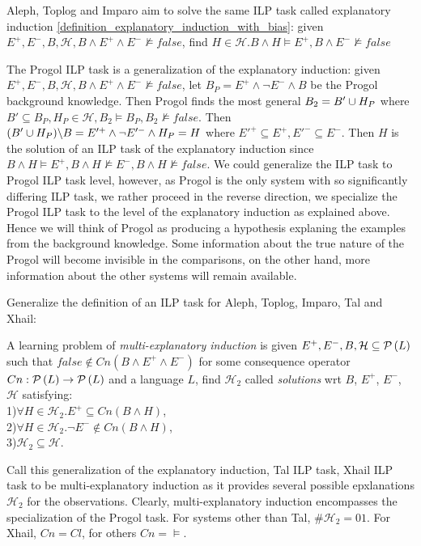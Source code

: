 Aleph, Toplog and Imparo aim to solve the same ILP task called explanatory induction \ref{definition_explanatory_induction_with_bias}:
given $E^{+}, E^{-}, B, \mathcal{H}, B \land E^{+} \land E^{-} \not\models false$, find $H \in \mathcal{H}. B \land H \models E^{+}, B \land E^{-} \not\models false$

The Progol ILP task is a generalization of the explanatory induction: given $E^{+}, E^{-}, B, \mathcal{H}, B \land E^{+} \land E^{-} \not\models false$,
let $B_P=E^{+} \land \neg E^{-} \land B$ be the Progol background knowledge. Then Progol finds the most general $B_2 = B' \cup H_P$ where $B' \subseteq B_P, H_P \in \mathcal{H}, B_2 \models B_P, B_2 \not\models false$.
Then $(B' \cup H_P) \backslash B=E'^{+} \land \neg E'^- \land H_P = H$ where $E'^+ \subseteq E^+, E'^- \subseteq E^-$. Then $H$ is the solution of an ILP task of the explanatory induction since $B \land H \models E^{+}, B \land H \not\models E^{-}, B \land H \not\models false$. We could generalize the ILP task to Progol ILP task level, however, as Progol is the only system with so significantly differing ILP task, we rather proceed in the reverse direction, we specialize the Progol ILP task to the level of the explanatory induction as explained above. Hence we will think of Progol as producing a hypothesis explaning the examples from the background knowledge. Some information about the true nature of the Progol will become invisible in the comparisons, on the other hand, more information about the other systems will remain available.

Generalize the definition of an ILP task for Aleph, Toplog, Imparo, Tal and Xhail:

\begin{defn}A learning problem of \emph{multi-explanatory induction} is
given $E^{+}, E^{-}, B, \mathcal{H} \subseteq \mathcal{P} \left({ L }\right)$ such that $false \not\in Cn(B \land E^{+} \land E^{-})$ for some consequence operator $Cn:\mathcal{P} \left({ L }\right) \to \mathcal{P} \left({ L }\right)$ and a language $L$,
find $\mathcal{H}_2$ called \emph{solutions} wrt $B$, $E^+$, $E^-$, $\mathcal{H}$ satisfying:\\
1)$\forall H \in \mathcal{H}_2. E^{+} \subseteq Cn(B \land H)$,\\
2)$\forall H \in \mathcal{H}_2. \neg E^{-} \not\in Cn(B \land H)$,\\
3)$\mathcal{H}_2 \subseteq \mathcal{H}$.

\end{defn}
Call this generalization of the explanatory induction, Tal ILP task, Xhail ILP task to be multi-explanatory induction as it provides several possible  epxlanations $\mathcal{H}_2$ for the observations. Clearly, multi-explanatory induction encompasses the specialization of the Progol task. For systems other than Tal, $\#\mathcal{H}_2=01$. For Xhail, $Cn=Cl$, for others $Cn=\models$.

